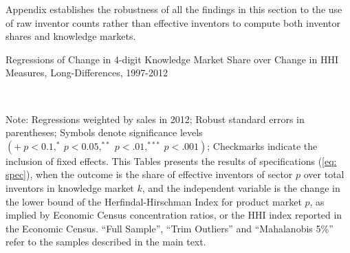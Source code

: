 Appendix \label{app: Using-N-inv-1} establishes the robustness of
all the findings in this section to the use of raw inventor counts
rather than effective inventors to compute both inventor shares and
knowledge markets.

\begin{sidewaystable}
\caption{Regressions of Change in 4-digit Knowledge Market Share over Change
in HHI Measures, Long-Differences, 1997-2012\label{tab: RegShInvNoctrl}}

\begin{centering}
\scalebox{.9}{}\\
\par\end{centering}
\raggedright{}{\small{}Note: Regressions weighted by sales in 2012;
Robust standard errors in parentheses; Symbols denote significance
levels $\left(+\ p<0.1,^{*}\ p<0.05,^{**}\ p<.01,^{***}\ p<.001\right)$;
Checkmarks indicate the inclusion of fixed effects. This Tables presents
the results of specifications (\ref{eq: spec}), when the outcome
is the share of effective inventors of sector $p$ over total inventors
in knowledge market $k$, and the independent variable is the change
in the lower bound of the Herfindal-Hirschman Index for product market
$p$, as implied by Economic Census concentration ratios, or the HHI
index reported in the Economic Census. ``Full Sample'', ``Trim
Outliers'' and ``Mahalanobis 5\%'' refer to the samples described
in the main text.}{\small\par}
\end{sidewaystable}


